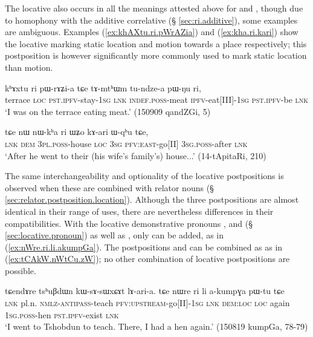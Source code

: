  The locative  also occurs in all the meanings attested above for  and , though due to homophony with the additive correlative  (§ \ref{sec:ri.additive}), some examples are ambiguous. Examples (\ref{ex:khAXtu.ri.pWrAZia}) and (\ref{ex:kha.ri.kari}) show the locative  marking static location and motion towards a place respectively;  this postposition is however significantly more commonly used to mark static location than motion.

\begin{exe}
\ex \label{ex:khAXtu.ri.pWrAZia}
\gll   kʰɤxtu ri pɯ-rɤʑi-a tɕe tɤ-mtʰɯm tu-ndze-a pɯ-ŋu ri, \\
terrace \textsc{loc} \textsc{pst}.\textsc{ipfv}-stay-\textsc{1sg} \textsc{lnk} \textsc{indef}.\textsc{poss}-meat \textsc{ipfv}-eat[III]-\textsc{1sg} \textsc{pst}.\textsc{ipfv}-be \textsc{lnk} \\
\glt `I was on the terrace eating meat.' (150909 qandZGi, 5)
 \end{exe}
 
 \begin{exe}
\ex \label{ex:kha.ri.kari}
\gll   tɕe nɯ nɯ-kʰa ri ɯʑo kɤ-ari ɯ-qʰu tɕe, \\
\textsc{lnk} \textsc{dem} \textsc{3pl}.\textsc{poss}-house \textsc{loc} \textsc{3sg} \textsc{pfv}:\textsc{east}-go[II] \textsc{3sg}.\textsc{poss}-after \textsc{lnk} \\
\glt `After he went to their (his wife's family's) house...' (14-tApitaRi, 210)
  \end{exe}
  
The same interchangeability and optionality of the locative postpositions is observed when these are combined with relator nouns (§ \ref{sec:relator.postposition.location}). Although the three postpositions are almost identical in their range of uses, there are nevertheless differences in their compatibilities.  With the locative demonstrative pronouns , and   (§ \ref{sec:locative.pronoun}) as well as , only  can be added, as in (\ref{ex:nWre.ri.li.akumpGa}). The postpositions  and  can be combined as  as in (\ref{ex:tCAkW.nWtCu.zW}); no other combination of locative postpositions are possible.

 \begin{exe}
\ex \label{ex:nWre.ri.li.akumpGa}
\gll tɕendɤre tsʰuβdɯn kɯ-sɤ-sɯxɕɤt lɤ-ari-a. tɕe nɯre ri li a-kumpɣa pɯ-tu tɕe \\
\textsc{lnk} pl.n. \textsc{nmlz}-\textsc{antipass}-teach \textsc{pfv}:\textsc{upstream}-go[II]-\textsc{1sg} \textsc{lnk} \textsc{dem}:\textsc{loc} \textsc{loc} again \textsc{1sg}.\textsc{poss}-hen \textsc{pst}.\textsc{ipfv}-exist \textsc{lnk} \\
\glt `I went to Tshobdun to teach. There, I had a hen again.' (150819 kumpGa, 78-79)
  \end{exe}

